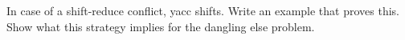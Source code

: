 In case of a shift-reduce conflict, yacc shifts. Write an example that
proves this. Show what this strategy
implies for the dangling else problem.
